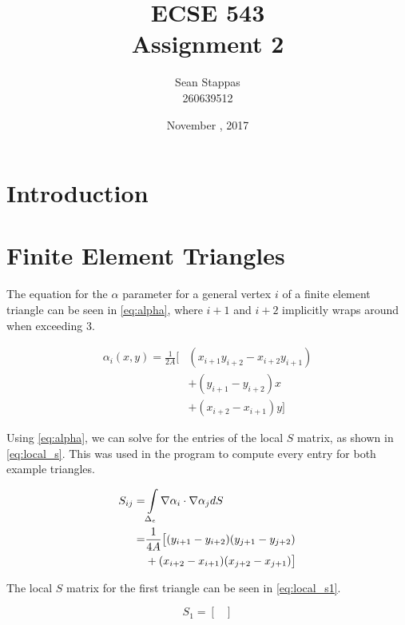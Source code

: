\documentclass[a4paper,titlepage]{article}
\title{\textbf{ECSE 543 \\ Assignment 2}}
\author{Sean Stappas \\ 260639512}
\date{November \nth{13}, 2017}
\begin{document}
	\sloppy
	\maketitle
	
	\tableofcontents
	
	
	\twocolumn
	
	\section*{Introduction}
	
	\section{Finite Element Triangles}
	
	The equation for the $\alpha$ parameter for a general vertex $i$ of a finite element triangle can be seen in \cref{eq:alpha}, where $i+1$ and $i+2$ implicitly wraps around when exceeding 3.
	
	\begin{equation} \label{eq:alpha}
		\begin{split}
			\alpha_i(x, y) = \frac{1}{2A} \big[
			& (x_{i+1}y_{i+2} - x_{i+2}y_{i+1}) \\
			& + (y_{i+1} - y_{i+2})x \\
			& + (x_{i+2} - x_{i+1})y \big]
		\end{split}
	\end{equation}
	
	Using \cref{eq:alpha}, we can solve for the entries of the local $S$ matrix, as shown in \cref{eq:local_s}. This was used in the program to compute every entry for both example triangles.
	
	\begin{equation} \label{eq:local_s}
		\begin{split}
			S_{ij} 
			= &\int\displaylimits_{\Delta_e}\nabla\alpha_i\cdot\nabla\alpha_j dS \\
			= &\frac{1}{4A} \big[ (y_{i+1} - y_{i+2})(y_{j+1} - y_{j+2}) \\
			&+ (x_{i+2} - x_{i+1})(x_{j+2} - x_{j+1})
			\big]
		\end{split}
	\end{equation}
	
	The local $S$ matrix for the first triangle can be seen in \cref{eq:local_s1}.
	
	\begin{equation} \label{eq:local_s1}
		S_1 =
			\begin{bmatrix}
				
			\end{bmatrix}
	\end{equation}
	
\end{document}
